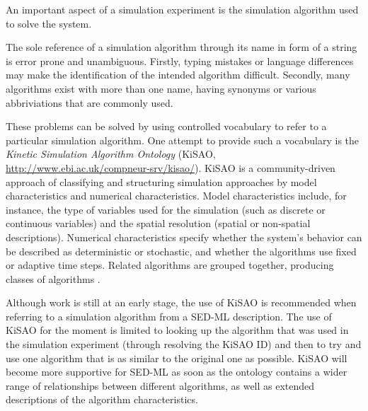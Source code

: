 \label{sec:kisao}

An important aspect of a simulation experiment is the simulation algorithm used to solve the system.

The sole reference of a simulation algorithm through its name in form of a string is error prone and unambiguous. Firstly, typing mistakes or language differences may make the identification of the intended algorithm difficult. Secondly, many algorithms exist with more than one name, having synonyms or various abbriviations that are commonly used.

These problems can be solved by using controlled vocabulary to refer to a particular simulation algorithm. One attempt to provide such a vocabulary is the \emph{Kinetic Simulation Algorithm Ontology} (KiSAO, \url{http://www.ebi.ac.uk/compneur-srv/kisao/}). KiSAO is a community-driven approach of classifying and structuring simulation approaches by model characteristics and numerical characteristics.  Model characteristics include, for instance, the type of variables used for the simulation (such as discrete or continuous variables) and the spatial resolution (spatial or non-spatial descriptions). Numerical characteristics specify whether the system's behavior can be described as deterministic or stochastic, and whether the algorithms use fixed or adaptive time steps.  
Related algorithms are grouped together, producing classes of algorithms \citep{CWK+10}.

Although work is still at an early stage, the use of KiSAO is recommended when referring to a simulation algorithm from a SED-ML description. The use of KiSAO for the moment is limited to looking up the algorithm that was used in the simulation experiment (through resolving the KiSAO ID) and then to try and use one algorithm that is as similar to the original one as possible. KiSAO will become more supportive for SED-ML as soon as the ontology contains a wider range of relationships between different algorithms, as well as extended descriptions of the algorithm characteristics.


